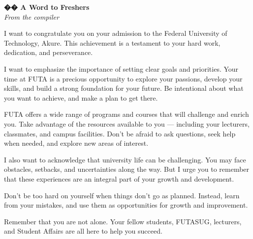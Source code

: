\documentclass[11pt,a4paper]{article}
\begin{document}
\begin{mindsetbox}
    \textbf{\color{primary}\Large �� A Word to Freshers}\\[0.3em]
    {\color{textGray}\itshape From the compiler}

    \vspace{1em}

    I want to congratulate you on your admission to the Federal University of Technology, Akure. This achievement is a testament to your hard work, dedication, and perseverance.

    \vspace{0.5em}

    I want to emphasize the importance of setting clear goals and priorities. Your time at FUTA is a precious opportunity to explore your passions, develop your skills, and build a strong foundation for your future. Be intentional about what you want to achieve, and make a plan to get there.

    \vspace{0.5em}

    FUTA offers a wide range of programs and courses that will challenge and enrich you. Take advantage of the resources available to you --- including your lecturers, classmates, and campus facilities. Don't be afraid to ask questions, seek help when needed, and explore new areas of interest.

    \vspace{0.5em}

    I also want to acknowledge that university life can be challenging. You may face obstacles, setbacks, and uncertainties along the way. But I urge you to remember that these experiences are an integral part of your growth and development.

    \vspace{0.5em}

    Don't be too hard on yourself when things don't go as planned. Instead, learn from your mistakes, and use them as opportunities for growth and improvement.

    \vspace{0.5em}

    Remember that you are not alone. Your fellow students, FUTASUG, lecturers, and Student Affairs are all here to help you succeed.
\end{mindsetbox}

\newpage
\end{document}
